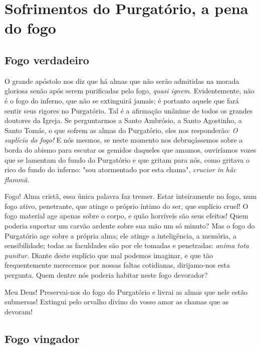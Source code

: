 \renewcommand{\thechapterdisplay}{Quinto dia}
\renewcommand{\thechapterrunner}{Sofrimentos do Purgatório, a pena do fogo}
\chapter[Quinto dia --- Sofrimentos do Purgatório, a pena do fogo]{Sofrimentos do Purgatório, a pena do fogo}
\section*{Fogo verdadeiro}

O grande apóstolo nos diz que há almas que não serão admitidas na morada gloriosa senão após serem purificadas pelo fogo, \textit{quasi ignem}. Evidentemente, não é o fogo do inferno, que não se extinguirá jamais; é portanto aquele que fará sentir seus rigores no Purgatório. Tal é a afirmação unânime de todos os grandes doutores da Igreja. Se perguntarmos a Santo Ambrósio, a Santo Agostinho, a Santo Tomás, o que sofrem as almas do Purgatório, eles nos responderão: \textit{O suplício do fogo!} E nós mesmos, se neste momento nos debruçássemos sobre a borda do abismo para escutar os gemidos daqueles que amamos, ouviríamos vozes que se lamentam do fundo do Purgatório e que gritam para nós, como gritava o rico do fundo do inferno: "sou atormentado por esta chama", \textit{crucior in hâc flammâ.}

Fogo! Alma cristã, essa única palavra faz tremer. Estar inteiramente no fogo, num fogo ativo, penetrante, que atinge o próprio íntimo do ser, que suplício cruel! O fogo material age apenas sobre o corpo, e quão horríveis são seus efeitos! Quem poderia suportar um carvão ardente sobre sua mão um só minuto? Mas o fogo do Purgatório age sobre a própria alma; ele atinge a inteligência, a memória, a sensibilidade; todas as faculdades são por ele tomadas e penetradas: \textit{anima tota punitur.} Diante deste suplício que mal podemos imaginar, e que tão frequentemente merecemos por nossas faltas cotidianas, dirijamo-nos esta pergunta. Quem dentre nós poderia habitar neste fogo devorador? 

Meu Deus! Preservai-nos do fogo do Purgatório e livrai as almas que nele estão submersas! Extingui pelo orvalho divino do vosso amor as chamas que as devoram!


\section*{Fogo vingador}

